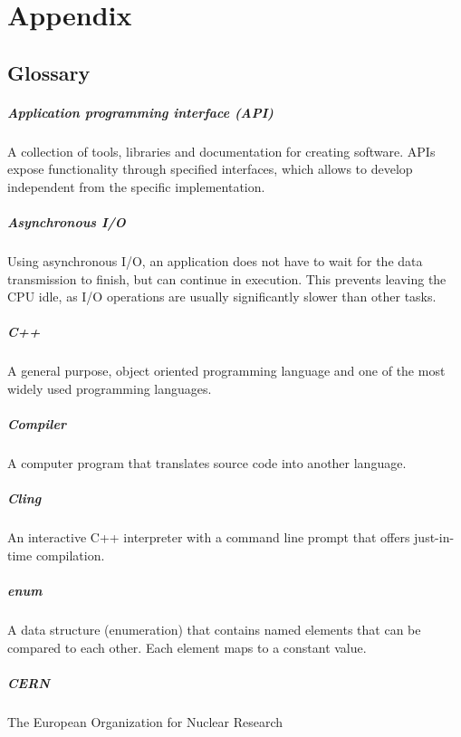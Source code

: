 \chapter{Appendix}
\section{Glossary}
\paragraph{Application programming interface (API)}
A collection of tools, libraries and documentation for creating software. APIs expose functionality through specified interfaces, which allows to develop independent from the specific implementation.
\paragraph{Asynchronous I/O}
Using asynchronous I/O, an application does not have to wait for the data transmission to finish, but can continue in execution. This prevents leaving the CPU idle, as I/O operations are usually significantly slower than other tasks.

\paragraph{C++}
A general purpose, object oriented programming language and one of the most widely used programming languages.

\paragraph{Compiler}
A computer program that translates source code into another language.

\paragraph{Cling}
An interactive C++ interpreter with a command line prompt that offers just-in-time compilation.

\paragraph{enum}
A data structure (enumeration) that contains named elements that can be compared to each other. Each element maps to a constant value.

\paragraph{CERN}
The European Organization for Nuclear Research

